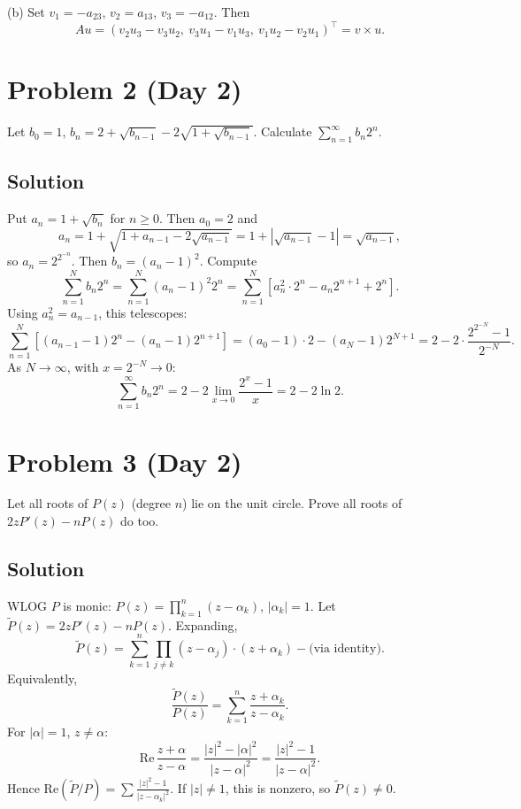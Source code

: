 \documentclass{article}
\begin{document}
(b) Set $v_1 = -a_{23}$, $v_2 = a_{13}$, $v_3 = -a_{12}$. Then
\[
Au = (v_2 u_3 - v_3 u_2,\ v_3 u_1 - v_1 u_3,\ v_1 u_2 - v_2 u_1)^\top = v \times u.
\]

\section*{Problem 2 (Day 2)}
Let $b_0 = 1$, $b_n = 2 + \sqrt{b_{n-1}} - 2\sqrt{1 + \sqrt{b_{n-1}}}$. Calculate $\sum_{n=1}^\infty b_n 2^n$.

\subsection*{Solution}
Put $a_n = 1 + \sqrt{b_n}$ for $n \geq 0$. Then $a_0 = 2$ and
\[
a_n = 1 + \sqrt{1 + a_{n-1} - 2\sqrt{a_{n-1}}} = 1 + |\sqrt{a_{n-1}} - 1| = \sqrt{a_{n-1}},
\]
so $a_n = 2^{2^{-n}}$. Then $b_n = (a_n - 1)^2$. Compute
\[
\sum_{n=1}^N b_n 2^n = \sum_{n=1}^N (a_n - 1)^2 2^n = \sum_{n=1}^N [a_n^2 \cdot 2^n - a_n 2^{n+1} + 2^n].
\]
Using $a_n^2 = a_{n-1}$, this telescopes:
\[
\sum_{n=1}^N [(a_{n-1} - 1) 2^n - (a_n - 1) 2^{n+1}] = (a_0 - 1) \cdot 2 - (a_N - 1) 2^{N+1} = 2 - 2 \cdot \frac{2^{2^{-N}} - 1}{2^{-N}}.
\]
As $N \to \infty$, with $x = 2^{-N} \to 0$:
\[
\sum_{n=1}^\infty b_n 2^n = 2 - 2\lim_{x\to 0}\frac{2^x - 1}{x} = 2 - 2\ln 2.
\]

\section*{Problem 3 (Day 2)}
Let all roots of $P(z)$ (degree $n$) lie on the unit circle. Prove all roots of $2zP'(z) - nP(z)$ do too.

\subsection*{Solution}
WLOG $P$ is monic: $P(z) = \prod_{k=1}^n (z - \alpha_k)$, $|\alpha_k| = 1$. Let $\widetilde P(z) = 2zP'(z) - nP(z)$. Expanding,
\[
\widetilde P(z) = \sum_{k=1}^n \prod_{j\neq k}(z - \alpha_j) \cdot (z + \alpha_k) - \text{(via identity)}.
\]
Equivalently,
\[
\frac{\widetilde P(z)}{P(z)} = \sum_{k=1}^n \frac{z + \alpha_k}{z - \alpha_k}.
\]
For $|\alpha| = 1$, $z \neq \alpha$:
\[
\mathrm{Re}\,\frac{z+\alpha}{z-\alpha} = \frac{|z|^2 - |\alpha|^2}{|z-\alpha|^2} = \frac{|z|^2 - 1}{|z-\alpha|^2}.
\]
Hence $\mathrm{Re}(\widetilde P/P) = \sum \frac{|z|^2 - 1}{|z - \alpha_k|^2}$. If $|z| \neq 1$, this is nonzero, so $\widetilde P(z) \neq 0$.
\end{document}
